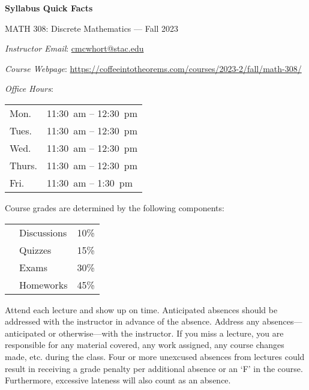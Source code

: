 \documentclass[11pt,letterpaper]{article}
\begin{document}
\begin{center} 
\bfseries
\color{stacred}
\LARGE Syllabus Quick Facts \par\vspace{0.2\baselineskip}
\Large MATH 308: Discrete Mathematics --- Fall 2023 
\end{center} \pspace


\hspace{0.53cm} {\itshape Instructor Email}: \href{mailto:cmcwhort@stac.edu}{cmcwhort@stac.edu} \par
\hspace{0.53cm} {\itshape Course Webpage}: \href{https://coffeeintotheorems.com/courses/2023-2/fall/math-308/}{https://coffeeintotheorems.com/courses/2023-2/fall/math-308/} \par
\hspace{0.53cm} {\itshape Office Hours}: 	\par \vspace{-0.3cm}
	\begin{table}[!ht]
	\centering
	\begin{tabular}{l || l}
	Mon. & 11:30~am -- 12:30~pm \\
	Tues. & 11:30~am -- 12:30~pm \\
	Wed. & 11:30~am -- 12:30~pm \\
	Thurs. & 11:30~am -- 12:30~pm \\
	Fri. & 11:30~am -- 1:30~pm
	\end{tabular}
	\end{table} \pspace


Course grades are determined by the following components: \par \vspace{-0.3cm}
	\begin{table}[!ht]
        \begin{tabular}{clr}
        & Discussions & 10\% \\
	& Quizzes & 15\% \\
	& Exams & 30\% \\
	& Homeworks & 45\% \\
        \end{tabular} 
        \end{table} \pspace


Attend each lecture and show up on time. Anticipated absences should be addressed with the instructor in advance of the absence. Address any absences---anticipated or otherwise---with the instructor. If you miss a lecture, you are responsible for any material covered, any work assigned, any course changes made, etc. during the class. Four or more unexcused absences from lectures could result in receiving a grade penalty per additional absence or an `F' in the course. Furthermore, excessive lateness will also count as an absence. \pspace
\end{document}
